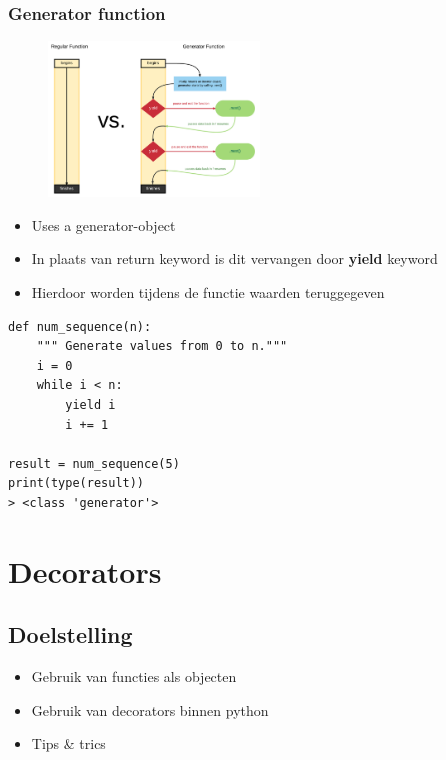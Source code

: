 \documentclass{article}
\begin{document}
\subsubsection{Generator function}

\begin{figure}[H]
    \centering
    \includegraphics[width=0.5\textwidth]{generator-function.png}
\end{figure}

\begin{itemize}
    \item Uses a generator-object
    \item In plaats van return keyword is dit vervangen door \textbf{yield} keyword
    \item Hierdoor worden tijdens de functie waarden teruggegeven
\end{itemize}

\begin{verbatim}
def num_sequence(n):
    """ Generate values from 0 to n."""
    i = 0
    while i < n:
        yield i
        i += 1

result = num_sequence(5)
print(type(result))
> <class 'generator'>
\end{verbatim}

\section{Decorators}

\subsection{Doelstelling}

\begin{itemize}
    \item Gebruik van functies als objecten
    \item Gebruik van decorators binnen python
    \item Tips \& trics
\end{itemize}
\end{document}
